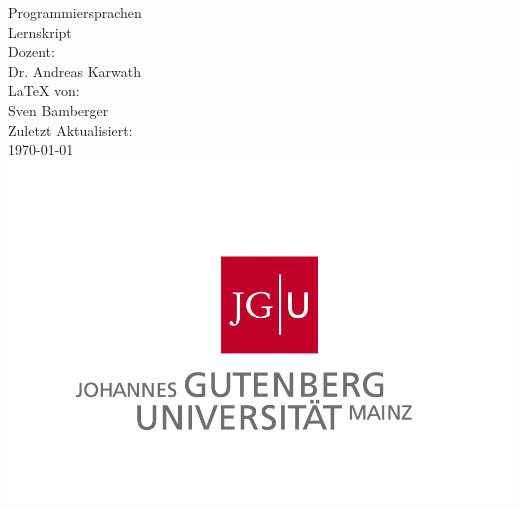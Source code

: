\begin{titlepage}
\center
\Large Programmiersprachen\large \\[2em]
Lernskript \\[2em]
Dozent:\\Dr. Andreas Karwath\\[2em]
\LaTeX{} von:\\Sven Bamberger\\[2em]
Zuletzt Aktualisiert:\\\today\\
\includegraphics[scale=.2]{front/pics/Logo.jpg}\\\quad\\
\end{titlepage}
